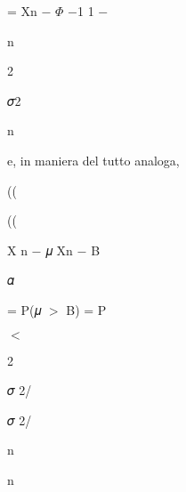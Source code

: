 \documentclass[a4paper,portrait,12pt]{article}
\begin{document}
\begin{flushleft}
= Xn $-$ $\Phi$ $-$1 1 $-$
\end{flushleft}


\begin{flushleft}
n
\end{flushleft}


2





\begin{flushleft}
𝜎2
\end{flushleft}


\begin{flushleft}
n
\end{flushleft}





\begin{flushleft}
e, in maniera del tutto analoga,
\end{flushleft}





((


((





\begin{flushleft}
X n $-$ 𝜇 Xn $-$ B
\end{flushleft}


\begin{flushleft}
𝛼
\end{flushleft}


\begin{flushleft}
= P(𝜇 $>$ B) = P
\end{flushleft}


$<$


2


\begin{flushleft}
𝜎 2/
\end{flushleft}


\begin{flushleft}
𝜎 2/
\end{flushleft}


\begin{flushleft}
n
\end{flushleft}


\begin{flushleft}
n
\end{flushleft}
\end{document}
